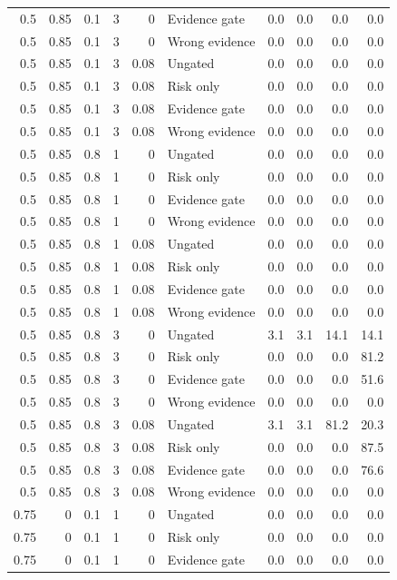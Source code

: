 \begin{longtable}{rrrrrlrrrr}
0.5 & 0.85 & 0.1 & 3 & 0 & Evidence gate & 0.0 & 0.0 & 0.0 & 0.0\\
0.5 & 0.85 & 0.1 & 3 & 0 & Wrong evidence & 0.0 & 0.0 & 0.0 & 0.0\\
0.5 & 0.85 & 0.1 & 3 & 0.08 & Ungated & 0.0 & 0.0 & 0.0 & 0.0\\
0.5 & 0.85 & 0.1 & 3 & 0.08 & Risk only & 0.0 & 0.0 & 0.0 & 0.0\\
0.5 & 0.85 & 0.1 & 3 & 0.08 & Evidence gate & 0.0 & 0.0 & 0.0 & 0.0\\
0.5 & 0.85 & 0.1 & 3 & 0.08 & Wrong evidence & 0.0 & 0.0 & 0.0 & 0.0\\
0.5 & 0.85 & 0.8 & 1 & 0 & Ungated & 0.0 & 0.0 & 0.0 & 0.0\\
0.5 & 0.85 & 0.8 & 1 & 0 & Risk only & 0.0 & 0.0 & 0.0 & 0.0\\
0.5 & 0.85 & 0.8 & 1 & 0 & Evidence gate & 0.0 & 0.0 & 0.0 & 0.0\\
0.5 & 0.85 & 0.8 & 1 & 0 & Wrong evidence & 0.0 & 0.0 & 0.0 & 0.0\\
0.5 & 0.85 & 0.8 & 1 & 0.08 & Ungated & 0.0 & 0.0 & 0.0 & 0.0\\
0.5 & 0.85 & 0.8 & 1 & 0.08 & Risk only & 0.0 & 0.0 & 0.0 & 0.0\\
0.5 & 0.85 & 0.8 & 1 & 0.08 & Evidence gate & 0.0 & 0.0 & 0.0 & 0.0\\
0.5 & 0.85 & 0.8 & 1 & 0.08 & Wrong evidence & 0.0 & 0.0 & 0.0 & 0.0\\
0.5 & 0.85 & 0.8 & 3 & 0 & Ungated & 3.1 & 3.1 & 14.1 & 14.1\\
0.5 & 0.85 & 0.8 & 3 & 0 & Risk only & 0.0 & 0.0 & 0.0 & 81.2\\
0.5 & 0.85 & 0.8 & 3 & 0 & Evidence gate & 0.0 & 0.0 & 0.0 & 51.6\\
0.5 & 0.85 & 0.8 & 3 & 0 & Wrong evidence & 0.0 & 0.0 & 0.0 & 0.0\\
0.5 & 0.85 & 0.8 & 3 & 0.08 & Ungated & 3.1 & 3.1 & 81.2 & 20.3\\
0.5 & 0.85 & 0.8 & 3 & 0.08 & Risk only & 0.0 & 0.0 & 0.0 & 87.5\\
0.5 & 0.85 & 0.8 & 3 & 0.08 & Evidence gate & 0.0 & 0.0 & 0.0 & 76.6\\
0.5 & 0.85 & 0.8 & 3 & 0.08 & Wrong evidence & 0.0 & 0.0 & 0.0 & 0.0\\
0.75 & 0 & 0.1 & 1 & 0 & Ungated & 0.0 & 0.0 & 0.0 & 0.0\\
0.75 & 0 & 0.1 & 1 & 0 & Risk only & 0.0 & 0.0 & 0.0 & 0.0\\
0.75 & 0 & 0.1 & 1 & 0 & Evidence gate & 0.0 & 0.0 & 0.0 & 0.0\\

\end{longtable}
